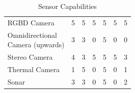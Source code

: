 \documentclass{article}
\begin{document}
\begin{table}[H]
\begin{adjustwidth}{-1.5in}{-1.5in}
\begin{tabular}{|l|c|c|c|c|c|c|}
		\multicolumn{1}{|l|}{\cellcolor{badhighlight!70}RGBD Camera }                     & \multicolumn{1}{c|}{\cellcolor{badhighlight!70} 5}                           & \multicolumn{1}{c|}{\cellcolor{badhighlight!70} 5 }                            & \multicolumn{1}{c|}{\cellcolor{badhighlight!70}5 }                         & \multicolumn{1}{c|}{\cellcolor{badhighlight!70}5 }   & \multicolumn{1}{c|}{\cellcolor{badhighlight!70}5 }                           & \multicolumn{1}{c|}{\cellcolor{badhighlight!70}5 }                       \\ \hdashline
		\makecell[l]{Omnidirectional \\ Camera (upwards)} & 3                         & 3                          & 0                       & 5                              & 0                        & 0                    \\ \hdashline
		Stereo Camera                    & 4                         & 3                          & 5                       & 5                              & 5                        & 3                    \\ \hdashline
		Thermal Camera                   & 1                         & 5                          & 0                       & 5                              & 0                        & 1                    \\ \hdashline
		Sonar                            & 3                         & 3                          & 0                       & 5                              & 0                        & 2                   \\ \hline		
		\end{tabular}
		\caption{Sensor Capabilities}
		\label{my-label}
		\end{adjustwidth}
		\end{table}
		
\end{document}
